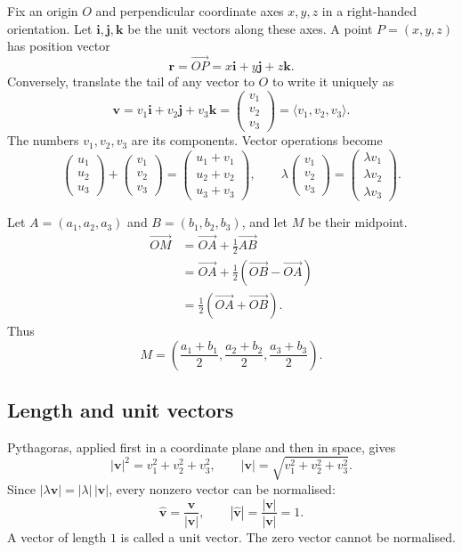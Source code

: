 Fix an origin $O$ and perpendicular coordinate axes $x,y,z$ in a right-handed
orientation. Let $\mathbf i,\mathbf j,\mathbf k$ be the unit vectors along
these axes. A point $P=(x,y,z)$ has position vector
\[
 \mathbf r=\overrightarrow{OP}=x\mathbf i+y\mathbf j+z\mathbf k.
\]
Conversely, translate the tail of any vector to $O$ to write it uniquely as
\[
 \mathbf v=v_1\mathbf i+v_2\mathbf j+v_3\mathbf k
 =\begin{pmatrix}v_1\\v_2\\v_3\end{pmatrix}
 =\langle v_1,v_2,v_3\rangle.
\]
The numbers $v_1,v_2,v_3$ are its components. Vector operations become
\[
 \begin{pmatrix}u_1\\u_2\\u_3\end{pmatrix}
 +\begin{pmatrix}v_1\\v_2\\v_3\end{pmatrix}
 =\begin{pmatrix}u_1+v_1\\u_2+v_2\\u_3+v_3\end{pmatrix},
 \qquad
 \lambda\begin{pmatrix}v_1\\v_2\\v_3\end{pmatrix}
 =\begin{pmatrix}\lambda v_1\\\lambda v_2\\\lambda v_3\end{pmatrix}.
\]

\begin{example}
Let $A=(a_1,a_2,a_3)$ and $B=(b_1,b_2,b_3)$, and let $M$ be their midpoint.
\begin{align*}
 \overrightarrow{OM}
 &=\overrightarrow{OA}+\frac12\overrightarrow{AB}\\
 &=\overrightarrow{OA}+\frac12(\overrightarrow{OB}-\overrightarrow{OA})\\
 &=\frac12(\overrightarrow{OA}+\overrightarrow{OB}).
\end{align*}
Thus
\[
 M=\left(\frac{a_1+b_1}{2},\frac{a_2+b_2}{2},\frac{a_3+b_3}{2}\right).
\]
\end{example}

\subsection{Length and unit vectors}
Pythagoras, applied first in a coordinate plane and then in space, gives
\[
 |\mathbf v|^2=v_1^2+v_2^2+v_3^2,
 \qquad |\mathbf v|=\sqrt{v_1^2+v_2^2+v_3^2}.
\]
Since $|\lambda\mathbf v|=|\lambda|\,|\mathbf v|$, every nonzero vector
can be normalised:
\[
 \widehat{\mathbf v}=\frac{\mathbf v}{|\mathbf v|},
 \qquad |\widehat{\mathbf v}|=
 \frac{|\mathbf v|}{|\mathbf v|}=1.
\]
A vector of length $1$ is called a unit vector. The zero vector cannot be normalised.

